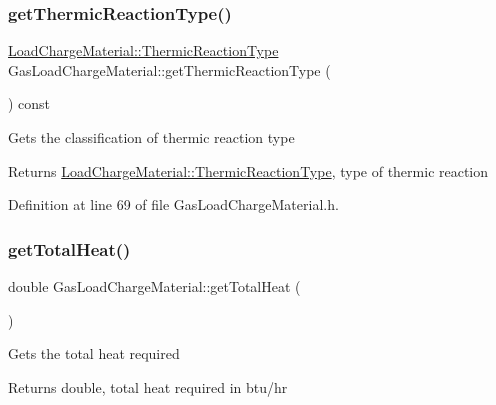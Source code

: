 \mbox{\label{class_gas_load_charge_material_ac801f30ccf58ce98fdb6b8cdb0a9767f}} 
\subsubsection{\texorpdfstring{get\+Thermic\+Reaction\+Type()}{getThermicReactionType()}}
{\footnotesize\ttfamily \hyperlink{class_load_charge_material_a51d4263e865a5d86236622dd3fe23fd1}{Load\+Charge\+Material\+::\+Thermic\+Reaction\+Type} Gas\+Load\+Charge\+Material\+::get\+Thermic\+Reaction\+Type (\begin{DoxyParamCaption}{ }\end{DoxyParamCaption}) const\hspace{0.3cm}{\ttfamily [inline]}}

Gets the classification of thermic reaction type \begin{DoxyReturn}{Returns}
\hyperlink{class_load_charge_material_a51d4263e865a5d86236622dd3fe23fd1}{Load\+Charge\+Material\+::\+Thermic\+Reaction\+Type}, type of thermic reaction 
\end{DoxyReturn}


Definition at line 69 of file Gas\+Load\+Charge\+Material.\+h.

\mbox{\label{class_gas_load_charge_material_a4f831537652ca09c4539982c626cc164}} 
\subsubsection{\texorpdfstring{get\+Total\+Heat()}{getTotalHeat()}}
{\footnotesize\ttfamily double Gas\+Load\+Charge\+Material\+::get\+Total\+Heat (\begin{DoxyParamCaption}{ }\end{DoxyParamCaption})}

Gets the total heat required \begin{DoxyReturn}{Returns}
double, total heat required in btu/hr 
\end{DoxyReturn}


